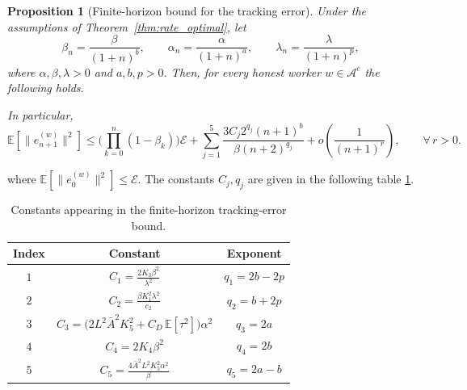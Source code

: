 \documentclass{article}
\newtheorem{proposition}[theorem]{Proposition}
\begin{document}
\begin{proposition}[Finite-horizon bound for the tracking error]
\label{thm:finite_horizon_alpha_beta_lambda}
Under the assumptions of Theorem~\ref{thm:rate_optimal}, let
\[
\beta_n=\frac{\beta}{(1+n)^b},\qquad
\alpha_n=\frac{\alpha}{(1+n)^a},\qquad
\lambda_n=\frac{\lambda}{(1+n)^p},
\]
where $\alpha,\beta,\lambda>0$ and $a,b,p>0$. Then, for every honest worker
$w\in\mathcal{A}^c$  the following holds. 


In particular,
\[
\mathbb{E}\!\left[\|e_{n+1}^{(w)}\|^2\right]
\le
\Bigg(\prod_{k=0}^{n}(1-\beta_k)\Bigg)\mathcal{E}
+
\sum_{j=1}^5
\frac{3 C_j 2^{q_j}(n+1)^b}{\beta (n+2)^{q_j}}
+
o\!\left(\frac{1}{(n+1)^r}\right),
\qquad \forall\, r>0.
\]
\end{proposition}
where \(\mathbb{E}\!\left[\|e_0^{(w)}\|^2\right]\le \mathcal E\).
The constants $C_j, q_j$ are given in the following table \ref{tab:constants_tracking_error}.


\begin{table}[t]
\centering
\caption{Constants appearing in the finite-horizon tracking-error bound.}
\label{tab:constants_tracking_error}
\renewcommand{\arraystretch}{1.25}
\begin{tabular}{c c c}
\hline
\textbf{Index} & \textbf{Constant} & \textbf{Exponent} \\
\hline
$1$ &
$\displaystyle C_1 = \frac{2K_3\beta^2}{\lambda^2}$ &
$\displaystyle q_1 = 2b-2p$ \\[0.8em]
$2$ &
$\displaystyle C_2 = \frac{\beta K_1^2\lambda^2}{c_2}$ &
$\displaystyle q_2 = b+2p$ \\[0.8em]
$3$ &
$\displaystyle C_3 = \Big(2L^2\bar A^2K_5^2+C_D\,\mathbb{E}[\tau^2]\Big)\alpha^2$ &
$\displaystyle q_3 = 2a$ \\[0.8em]
$4$ &
$\displaystyle C_4 = 2K_4\beta^2$ &
$\displaystyle q_4 = 2b$ \\[0.8em]
$5$ &
$\displaystyle C_5 = \frac{4\bar A^2L^2K_5^2\alpha^2}{\beta}$ &
$\displaystyle q_5 = 2a-b$ \\
\hline
\end{tabular}
\end{table}
\end{document}
